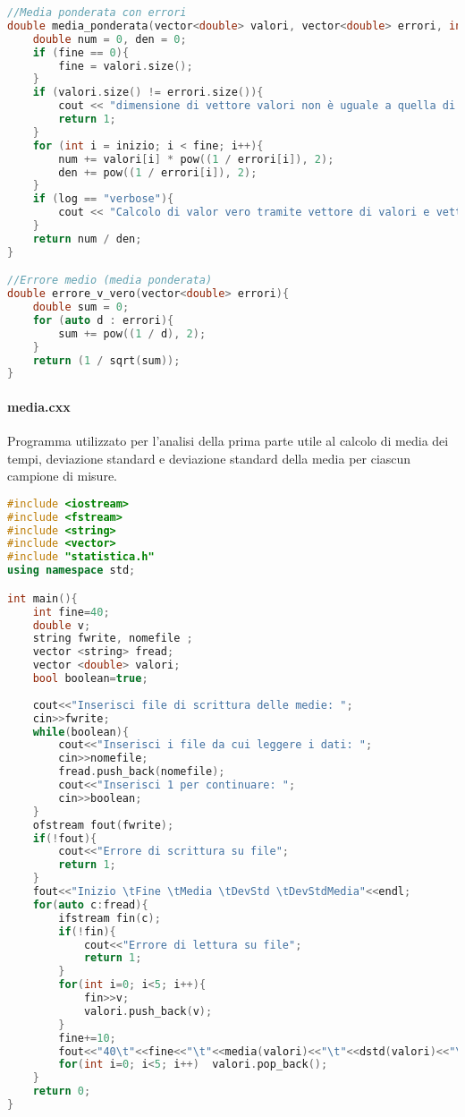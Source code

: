 \documentclass[a4paper,11pt,oneside]{article}
\begin{document}
\begin{lstlisting}[language=C++, label=lst:statistica.h, caption=statistica.h]
//Media ponderata con errori
double media_ponderata(vector<double> valori, vector<double> errori, int inizio = 0, int fine = 0, string log = ""){
    double num = 0, den = 0;
    if (fine == 0){
        fine = valori.size();
    }
    if (valori.size() != errori.size()){
        cout << "dimensione di vettore valori non è uguale a quella di vettore errori" << endl;
        return 1;
    }
    for (int i = inizio; i < fine; i++){
        num += valori[i] * pow((1 / errori[i]), 2);
        den += pow((1 / errori[i]), 2);
    }
    if (log == "verbose"){
        cout << "Calcolo di valor vero tramite vettore di valori e vettori di errori" << endl;
    }
    return num / den;
}

//Errore medio (media ponderata)
double errore_v_vero(vector<double> errori){
    double sum = 0;
    for (auto d : errori){
        sum += pow((1 / d), 2);
    }
    return (1 / sqrt(sum));
}
\end{lstlisting}
\paragraph{media.cxx} Programma utilizzato per l'analisi della prima parte utile al calcolo di media dei tempi, deviazione standard e deviazione standard della media per ciascun campione di misure. 
\begin{lstlisting}[language=C++, label=lst:media.cxx, caption=media.cxx]
#include <iostream>
#include <fstream>
#include <string>
#include <vector>
#include "statistica.h"
using namespace std;

int main(){
	int fine=40;
	double v;
	string fwrite, nomefile ;
	vector <string> fread;
	vector <double> valori;
	bool boolean=true;
	
	cout<<"Inserisci file di scrittura delle medie: ";
	cin>>fwrite;
	while(boolean){
		cout<<"Inserisci i file da cui leggere i dati: ";
		cin>>nomefile;
		fread.push_back(nomefile);
		cout<<"Inserisci 1 per continuare: ";
		cin>>boolean;
	}
	ofstream fout(fwrite);
	if(!fout){
		cout<<"Errore di scrittura su file";
		return 1;
	}
	fout<<"Inizio \tFine \tMedia \tDevStd \tDevStdMedia"<<endl;
	for(auto c:fread){
		ifstream fin(c);
		if(!fin){
			cout<<"Errore di lettura su file";
			return 1;
		}
		for(int i=0; i<5; i++){
			fin>>v;
			valori.push_back(v);
		}
		fine+=10;
		fout<<"40\t"<<fine<<"\t"<<media(valori)<<"\t"<<dstd(valori)<<"\t"<<dstd_media(valori)<<endl;
		for(int i=0; i<5; i++)	valori.pop_back();
	}
	return 0;
}
\end{lstlisting}
\end{document}
